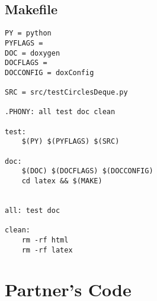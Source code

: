 \documentclass{article}
\begin{document}
\subsection{Makefile}
\begin{lstlisting}
PY = python
PYFLAGS = 
DOC = doxygen
DOCFLAGS =
DOCCONFIG = doxConfig

SRC = src/testCirclesDeque.py

.PHONY: all test doc clean

test: 
	$(PY) $(PYFLAGS) $(SRC)

doc: 
	$(DOC) $(DOCFLAGS) $(DOCCONFIG)
	cd latex && $(MAKE)
	

all: test doc

clean:
	rm -rf html
	rm -rf latex

\end{lstlisting}

\section{Partner's Code}
\end{document}
